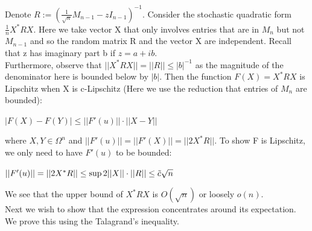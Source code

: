 \documentclass{article}
\begin{document}
Denote $R := \left(\frac{1}{\sqrt{n}}M_{n-1} -zI_{n-1}\right)^{-1}$. Consider the stochastic quadratic form $\frac{1}{n}X^*RX$. Here we take vector X that only involves entries that are in $M_n$ but not $M_{n-1}$ and so the random matrix R and the vector X are independent. Recall that z has imaginary part b if $z = a+ib$. \\
Furthermore, observe that $|| X^*R X|| = ||R|| \leq |b|^{-1}$ as the magnitude of the denominator here is bounded below by $|b|$. Then the function $F(X) = X^*RX$ is Lipschitz when X is c-Lipschitz (Here we use the reduction that entries of $M_n$ are bounded):
\begin{center}
    $|F(X)-F(Y)| \leq ||F'(u)||\cdot ||X-Y||$
\end{center}
where $X,Y \in \Omega^n$ and $||F'(u)|| = ||F'(X)|| = ||2X^*R||$. To show F is Lipschitz, we only need to have $F'(u)$ to be bounded:
\begin{center}
    $||F'(u)|| = ||2X^*R|| \leq \sup 2||X||\cdot ||R|| \leq \Tilde{c}\sqrt{n}$
\end{center}
We see that the upper bound of $X^*RX$ is $O(\sqrt{n})$ or loosely $o(n)$.\\
Next we wish to show that the expression concentrates around its expectation. We prove this using the Talagrand's inequality.
\end{document}
